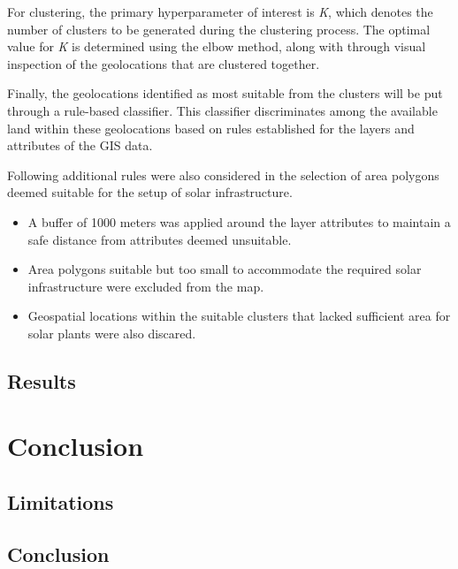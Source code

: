 \documentclass[a4paper,12pt]{Classes/RoboticsLaTeX}
\begin{document}
		For clustering, the primary hyperparameter of interest is \textit{K}, which denotes the number of clusters to be generated during the clustering process. The optimal value for \textit{K} is determined 
		using the elbow method, along with through visual inspection of the geolocations that are clustered together.
		
		Finally, the geolocations identified as most suitable from the clusters will be put through a rule-based classifier. This classifier discriminates among the available land within these geolocations based on rules established for the layers and attributes of the \ac{GIS} data.
		
		
		Following additional rules were also considered in the selection of area polygons deemed suitable for the setup of solar infrastructure. 

		\begin{itemize}
			\item A buffer of 1000 meters was applied around the layer attributes to maintain a safe distance from attributes deemed unsuitable.
			\item Area polygons suitable but too small to accommodate the required solar infrastructure were excluded from the map.
			\item Geospatial locations within the suitable clusters that lacked sufficient area for solar plants were also discared.
		\end{itemize}

		



	


	

	



	\section{Results}

	\chapter{Conclusion}
	\label{chap:conclusion}
	\section{Limitations}
	\section{Conclusion}
\end{document}
